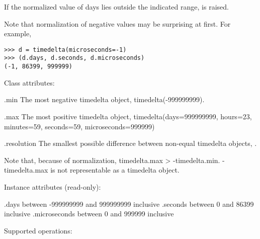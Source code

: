     If the normalized value of days lies outside the indicated range,
     is raised.

    Note that normalization of negative values may be surprising at first.
    For example,

\begin{verbatim}
>>> d = timedelta(microseconds=-1)
>>> (d.days, d.seconds, d.microseconds)
(-1, 86399, 999999)
\end{verbatim}


Class attributes:

    .min
        The most negative timedelta object, timedelta(-999999999).

    .max
        The most positive timedelta object,
        timedelta(days=999999999, hours=23, minutes=59, seconds=59,
                  microseconds=999999)

    .resolution
        The smallest possible difference between non-equal timedelta
        objects, .

    Note that, because of normalization, timedelta.max > -timedelta.min.
    -timedelta.max is not representable as a timedelta object.

Instance attributes (read-only):

    .days           between -999999999 and 999999999 inclusive
    .seconds        between 0 and 86399 inclusive
    .microseconds   between 0 and 999999 inclusive

Supported operations:

